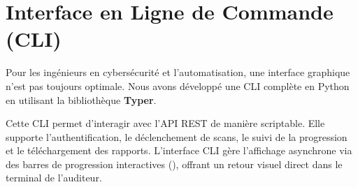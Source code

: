 \section{Interface en Ligne de Commande (CLI)}
Pour les ingénieurs en cybersécurité et l'automatisation, une interface graphique n'est pas toujours optimale. Nous avons développé une CLI complète en Python en utilisant la bibliothèque \textbf{Typer}.

Cette CLI permet d'interagir avec l'API REST de manière scriptable. Elle supporte l'authentification, le déclenchement de scans, le suivi de la progression et le téléchargement des rapports. L'interface CLI gère l'affichage asynchrone via des barres de progression interactives (), offrant un retour visuel direct dans le terminal de l'auditeur.

\cleardoublepage
